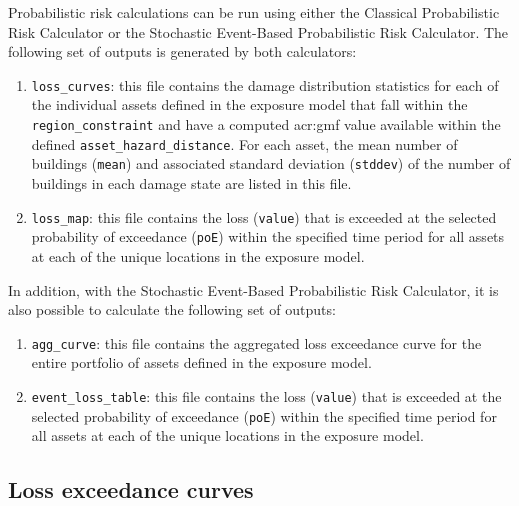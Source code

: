Probabilistic risk calculations can be run using either the Classical
Probabilistic Risk Calculator or the Stochastic Event-Based Probabilistic Risk
Calculator. The following set of outputs is generated by both calculators:

\begin{enumerate}

  \item \Verb+loss_curves+: this file contains the damage distribution
    statistics for each of the individual \glspl{asset} defined in the
    \gls{exposure model} that fall within the \Verb+region_constraint+ and have
    a computed \gls{acr:gmf} value available within the defined
    \Verb+asset_hazard_distance+. For each \gls{asset}, the mean number of
    buildings (\Verb+mean+) and associated standard deviation (\Verb+stddev+)
    of the number of buildings in each damage state are listed in this file.

  \item \Verb+loss_map+: this file contains the loss (\Verb+value+) 
    that is exceeded at the selected probability of exceedance (\Verb+poE+)
    within the specified time period for all \glspl{asset} at each of the unique
    locations in the \gls{exposure model}.

\end{enumerate}

In addition, with the Stochastic Event-Based Probabilistic Risk
Calculator, it is also possible to calculate the following set of outputs:

\begin{enumerate}

  \item \Verb+agg_curve+: this file contains the aggregated loss exceedance
    curve for the entire portfolio of \glspl{asset} defined
    in the \gls{exposure model}.

  \item \Verb+event_loss_table+: this file contains the loss (\Verb+value+) 
    that is exceeded at the selected probability of exceedance (\Verb+poE+)
    within the specified time period for all \glspl{asset} at each of the unique
    locations in the \gls{exposure model}.

\end{enumerate}



\subsection{Loss exceedance curves}
\label{subsec:loss_curves}

